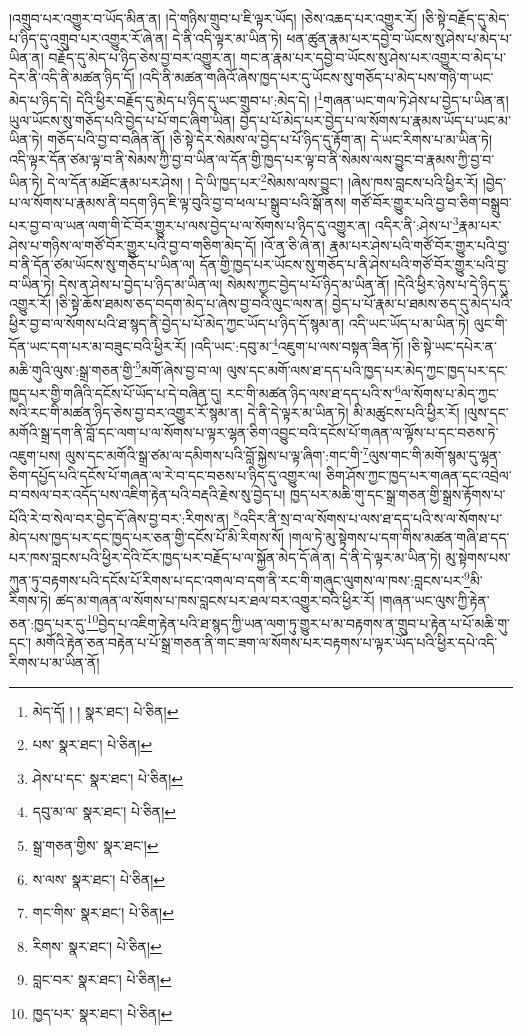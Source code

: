 །འགྲུབ་པར་འགྱུར་བ་ཡོད་མིན་ན། །དེ་གཉིས་གྲུབ་པ་ཇི་ལྟར་ཡོད། །ཅེས་འཆད་པར་འགྱུར་རོ། །ཅི་སྟེ་བརྗོད་དུ་མེད་པ་ཉིད་དུ་འགྲུབ་པར་འགྱུར་རོ་ཞེ་ན། དེ་ནི་འདི་ལྟར་མ་ཡིན་ཏེ། ཕན་ཚུན་རྣམ་པར་དབྱེ་བ་ཡོངས་སུ་ཤེས་པ་མེད་པ་ཡིན་ན། བརྗོད་དུ་མེད་པ་ཉིད་ཅེས་བྱ་བར་འགྱུར་ན། གང་ན་རྣམ་པར་དབྱེ་བ་ཡོངས་སུ་ཤེས་པར་འགྱུར་བ་མེད་པ་དེར་ནི་འདི་ནི་མཚན་ཉིད་དོ། །འདི་ནི་མཚན་གཞིའོ་ཞེས་ཁྱད་པར་དུ་ཡོངས་སུ་གཅོད་པ་མེད་པས་གཉི་ག་ཡང་མེད་པ་ཉིད་དེ། དེའི་ཕྱིར་བརྗོད་དུ་མེད་པ་ཉིད་དུ་ཡང་གྲུབ་པ་:མེད་དེ། །\footnote{མེད་དོ། ། །  སྣར་ཐང་།  པེ་ཅིན། }གཞན་ཡང་གལ་ཏེ་ཤེས་པ་བྱེད་པ་ཡིན་ན། ཡུལ་ཡོངས་སུ་གཅོད་པའི་བྱེད་པ་པོ་གང་ཞིག་ཡིན། བྱེད་པ་པོ་མེད་པར་བྱེད་པ་ལ་སོགས་པ་རྣམས་ཡོད་པ་ཡང་མ་ཡིན་ཏེ། གཅོད་པའི་བྱ་བ་བཞིན་ནོ། །ཅི་སྟེ་དེར་སེམས་ལ་བྱེད་པ་པོ་ཉིད་དུ་རྟོག་ན། དེ་ཡང་རིགས་པ་མ་ཡིན་ཏེ། འདི་ལྟར་དོན་ཙམ་ལྟ་བ་ནི་སེམས་ཀྱི་བྱ་བ་ཡིན་ལ་དོན་གྱི་ཁྱད་པར་ལྟ་བ་ནི་སེམས་ལས་བྱུང་བ་རྣམས་ཀྱི་བྱ་བ་ཡིན་ཏེ། དེ་ལ་དོན་མཐོང་རྣམ་པར་ཤེས། །
དེ་ཡི་ཁྱད་པར་\footnote{པས་  སྣར་ཐང་།  པེ་ཅིན། }སེམས་ལས་བྱུང་། །ཞེས་ཁས་བླངས་པའི་ཕྱིར་རོ། །བྱེད་པ་ལ་སོགས་པ་རྣམས་ནི་བདག་ཉིད་ཇི་ལྟ་བུའི་བྱ་བ་ཕལ་པ་སྒྲུབ་པའི་སྒོ་ནས། གཙོ་བོར་གྱུར་པའི་བྱ་བ་ཅིག་བསྒྲུབ་པར་བྱ་བ་ལ་ཡན་ལག་གི་ངོ་བོར་གྱུར་པ་ལས་བྱེད་པ་ལ་སོགས་པ་ཉིད་དུ་འགྱུར་ན། འདིར་ནི་:ཤེས་པ་\footnote{ཤེས་པ་དང་  སྣར་ཐང་།  པེ་ཅིན། }རྣམ་པར་ཤེས་པ་གཉིས་ལ་གཙོ་བོར་གྱུར་པའི་བྱ་བ་གཅིག་མེད་དོ། །འོ་ན་ཅི་ཞེ་ན། རྣམ་པར་ཤེས་པའི་གཙོ་བོར་གྱུར་པའི་བྱ་བ་ནི་དོན་ཙམ་ཡོངས་སུ་གཅོད་པ་ཡིན་ལ། དོན་གྱི་ཁྱད་པར་ཡོངས་སུ་གཅོད་པ་ནི་ཤེས་པའི་གཙོ་བོར་གྱུར་པའི་བྱ་བ་ཡིན་ཏེ། དེས་ན་ཤེས་པ་བྱེད་པ་ཉིད་མ་ཡིན་ལ། སེམས་ཀྱང་བྱེད་པ་པོ་ཉིད་མ་ཡིན་ནོ། །དེའི་ཕྱིར་ཉེས་པ་དེ་ཉིད་དུ་འགྱུར་རོ། །ཅི་སྟེ་ཆོས་ཐམས་ཅད་བདག་མེད་པ་ཞེས་བྱ་བའི་ལུང་ལས་ན། བྱེད་པ་པོ་རྣམ་པ་ཐམས་ཅད་དུ་མེད་པའི་ཕྱིར་བྱ་བ་ལ་སོགས་པའི་ཐ་སྙད་ནི་བྱེད་པ་པོ་མེད་ཀྱང་ཡོད་པ་ཉིད་དོ་སྙམ་ན། འདི་ཡང་ཡོད་པ་མ་ཡིན་ཏེ། ལུང་གི་དོན་ཡང་དག་པར་མ་བཟུང་བའི་ཕྱིར་རོ། །འདི་ཡང་:དབུ་མ་\footnote{དབུ་མ་ལ་  སྣར་ཐང་།  པེ་ཅིན། }འཇུག་པ་ལས་བསྟན་ཟིན་ཏོ། །ཅི་སྟེ་ཡང་དཔེར་ན་མཆི་གུའི་ལུས་:སྒྲ་གཅན་གྱི་\footnote{སྒྲ་གཅན་གྱིས་  སྣར་ཐང་། }མགོ་ཞེས་བྱ་བ་ལ། ལུས་དང་མགོ་ལས་ཐ་དད་པའི་ཁྱད་པར་མེད་ཀྱང་ཁྱད་པར་དང་ཁྱད་པར་གྱི་གཞིའི་དངོས་པོ་ཡོད་པ་དེ་བཞིན་དུ། རང་གི་མཚན་ཉིད་ལས་ཐ་དད་པའི་ས་\footnote{ས་ལས་  སྣར་ཐང་།  པེ་ཅིན། }ལ་སོགས་པ་མེད་ཀྱང་སའི་རང་གི་མཚན་ཉིད་ཅེས་བྱ་བར་འགྱུར་རོ་སྙམ་ན། དེ་ནི་དེ་ལྟར་མ་ཡིན་ཏེ། མི་མཚུངས་པའི་ཕྱིར་རོ། །ལུས་དང་མགོའི་སྒྲ་དག་ནི་བློ་དང་ལག་པ་ལ་སོགས་པ་ལྟར་ལྷན་ཅིག་འབྱུང་བའི་དངོས་པོ་གཞན་ལ་ལྟོས་པ་དང་བཅས་ཏེ་འཇུག་པས། ལུས་དང་མགོའི་སྒྲ་ཙམ་ལ་དམིགས་པའི་བློ་སྐྱེས་པ་ལྟ་ཞིག་:གང་གི་\footnote{གང་གིས་  སྣར་ཐང་།  པེ་ཅིན། }ལུས་གང་གི་མགོ་སྙམ་དུ་ལྷན་ཅིག་དཔྱོད་པའི་དངོས་པོ་གཞན་ལ་རེ་བ་དང་བཅས་པ་ཉིད་དུ་འགྱུར་ལ། ཅིག་ཤོས་ཀྱང་ཁྱད་པར་གཞན་དང་འབྲེལ་བ་བསལ་བར་འདོད་པས་འཇིག་རྟེན་པའི་བརྡའི་རྗེས་སུ་བྱེད་པ། ཁྱད་པར་མཆི་གུ་དང་སྒྲ་གཅན་གྱི་སྒྲས་རྟོགས་པ་པོའི་རེ་བ་སེལ་བར་བྱེད་དོ་ཞེས་བྱ་བར་:རིགས་ན། \footnote{རིགས་  སྣར་ཐང་།  པེ་ཅིན། }འདིར་ནི་སྲ་བ་ལ་སོགས་པ་ལས་ཐ་དད་པའི་ས་ལ་སོགས་པ་མེད་པས་ཁྱད་པར་དང་ཁྱད་པར་ཅན་གྱི་དངོས་པོ་མི་རིགས་སོ། །གལ་ཏེ་མུ་སྟེགས་པ་དག་གིས་མཚན་གཞི་ཐ་དད་པར་ཁས་བླངས་པའི་ཕྱིར་དེའི་ངོར་ཁྱད་པར་བརྗོད་པ་ལ་སྐྱོན་མེད་དོ་ཞེ་ན། དེ་ནི་དེ་ལྟར་མ་ཡིན་ཏེ། མུ་སྟེགས་པས་ཀུན་ཏུ་བརྟགས་པའི་དངོས་པོ་རིགས་པ་དང་འགལ་བ་དག་ནི་རང་གི་གཞུང་ལུགས་ལ་ཁས་:བླངས་པར་\footnote{བླང་བར་  སྣར་ཐང་།  པེ་ཅིན། }མི་རིགས་ཏེ། ཚད་མ་གཞན་ལ་སོགས་པ་ཁས་བླངས་པར་ཐལ་བར་འགྱུར་བའི་ཕྱིར་རོ། །གཞན་ཡང་ལུས་ཀྱི་རྟེན་ཅན་:ཁྱད་པར་དུ་\footnote{ཁྱད་པར་  སྣར་ཐང་།  པེ་ཅིན། }བྱེད་པ་འཇིག་རྟེན་པའི་ཐ་སྙད་ཀྱི་ཡན་ལག་ཏུ་གྱུར་པ་མ་བརྟགས་ན་གྲུབ་པ་རྟེན་པ་པོ་མཆི་གུ་དང་། མགོའི་རྟེན་ཅན་བརྟེན་པ་པོ་སྒྲ་གཅན་ནི་གང་ཟག་ལ་སོགས་པར་བརྟགས་པ་ལྟར་ཡོད་པའི་ཕྱིར་དཔེ་འདི་རིགས་པ་མ་ཡིན་ནོ། 